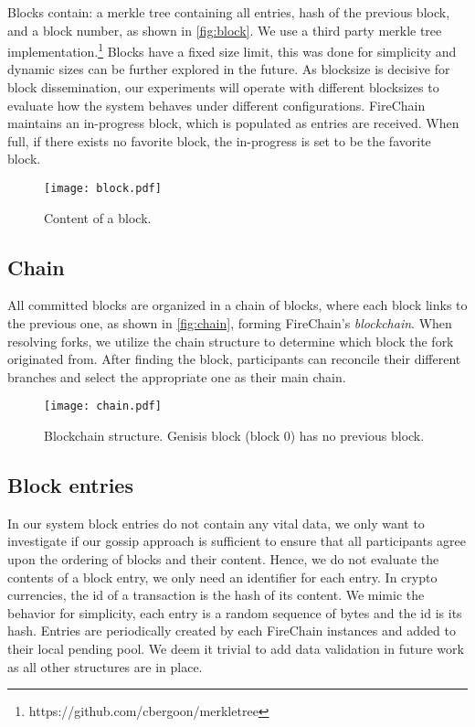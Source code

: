\documentclass[USenglish]{uit-thesis}
\begin{document}
Blocks contain: a merkle tree containing all entries, hash of the previous block, and a block number, as shown in \autoref{fig:block}.
We use a third party merkle tree implementation.\footnote{https://github.com/cbergoon/merkletree}  
Blocks have a fixed size limit, this was done for simplicity and dynamic sizes can be further explored in the future.
As blocksize is decisive for block dissemination, our experiments will operate with different blocksizes to evaluate how the system behaves under different configurations.
FireChain maintains an in-progress block, which is populated as entries are received.
When full, if there exists no favorite block, the in-progress is set to be the favorite block. 

\begin{figure}[H]
	\centering
	\texttt{[image: block.pdf]}
	\caption{Content of a block.}
	\label{fig:block}
\end{figure}


\subsection{Chain}

All committed blocks are organized in a chain of blocks, where each block links to the previous one, as shown in \autoref{fig:chain}, forming FireChain's \textit{blockchain}.
When resolving forks, we utilize the chain structure to determine which block the fork originated from.
After finding the block, participants can reconcile their different branches and select the appropriate one as their main chain. 
\begin{figure}[H]
	\centering
	\texttt{[image: chain.pdf]}
	\caption[Blockchain structure]{Blockchain structure. Genisis block (block 0) has no previous block.}
	\label{fig:chain}
\end{figure}




\subsection{Block entries}
In our system block entries do not contain any vital data, we only want to investigate if our gossip approach is sufficient to ensure that all participants agree upon the ordering of blocks and their content.
Hence, we do not evaluate the contents of a block entry, we only need an identifier for each entry.
In crypto currencies, the id of a transaction is the hash of its content.
We mimic the behavior for simplicity, each entry is a random sequence of bytes and the id is its hash.
Entries are periodically created by each FireChain instances and added to their local pending pool. 
We deem it trivial to add data validation in future work as all other structures are in place.
\end{document}
